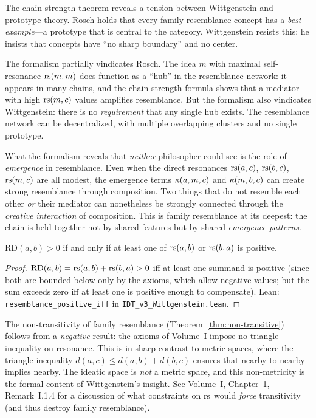 \begin{interpretation}
The chain strength theorem reveals a tension between Wittgenstein and prototype
theory. Rosch holds that every family resemblance concept has a \emph{best
example}---a prototype that is central to the category. Wittgenstein resists
this: he insists that concepts have ``no sharp boundary'' and no center.

The formalism partially vindicates Rosch. The idea $m$ with maximal
self-resonance $\mathrm{rs}(m, m)$ does function as a ``hub'' in the resemblance
network: it appears in many chains, and the chain strength formula shows
that a mediator with high $\mathrm{rs}(m, c)$ values amplifies resemblance. But
the formalism also vindicates Wittgenstein: there is no \emph{requirement}
that any single hub exists. The resemblance network can be decentralized,
with multiple overlapping clusters and no single prototype.

What the formalism reveals that \emph{neither} philosopher could see is
the role of \emph{emergence} in resemblance. Even when the direct resonances
$\mathrm{rs}(a, c)$, $\mathrm{rs}(b, c)$, $\mathrm{rs}(m, c)$ are all modest, the emergence terms
$\kappa(a, m, c)$ and $\kappa(m, b, c)$ can create strong resemblance
through composition. Two things that do not resemble each other \emph{or}
their mediator can nonetheless be strongly connected through the \emph{creative
interaction} of composition. This is family resemblance at its deepest:
the chain is held together not by shared features but by shared
\emph{emergence patterns}.
\end{interpretation}

\begin{theorem}
\label{thm:positive-resemblance}
$\mathrm{RD}(a, b) > 0$ if and only if at least one of $\mathrm{rs}(a, b)$
or $\mathrm{rs}(b, a)$ is positive.
\end{theorem}

\begin{proof}
$\mathrm{RD}(a, b) = \mathrm{rs}(a, b) + \mathrm{rs}(b, a) > 0$ iff at least one summand
is positive (since both are bounded below only by the axioms, which allow
negative values; but the sum exceeds zero iff at least one is positive
enough to compensate).
Lean: \texttt{resemblance\_positive\_iff} in \texttt{IDT\_v3\_Wittgenstein.lean}.
\end{proof}

\begin{remark}
The non-transitivity of family resemblance (Theorem~\ref{thm:non-transitive})
follows from a \emph{negative} result: the axioms of Volume~I impose no
triangle inequality on resonance. This is in sharp contrast to metric spaces,
where the triangle inequality $d(a,c) \leq d(a,b) + d(b,c)$ ensures that
nearby-to-nearby implies nearby. The ideatic space is \emph{not} a metric
space, and this non-metricity is the formal content of Wittgenstein's insight.
See Volume~I, Chapter~1, Remark~I.1.4 for a discussion of what constraints
on $\mathrm{rs}$ would \emph{force} transitivity (and thus destroy family resemblance).
\end{remark}

